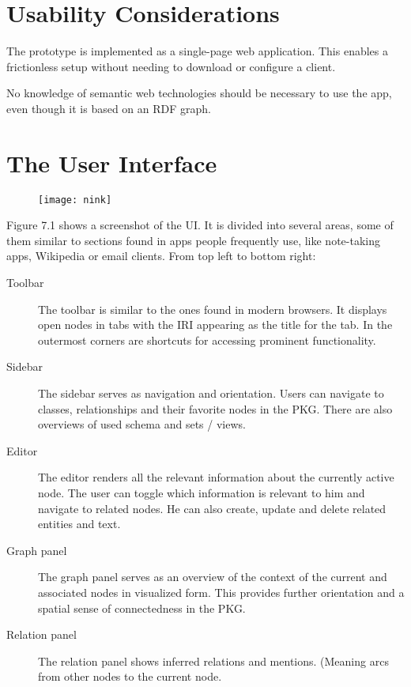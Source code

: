 \section{Usability Considerations}

The prototype is implemented as a single-page web application. This enables a frictionless setup without needing to download or configure a client.

No knowledge of semantic web technologies should be necessary to use the app, even though it is based on an RDF graph.

\section{The User Interface} 

\begin{figure}[H]
    \texttt{[image: nink]}
\end{figure}

Figure 7.1 shows a screenshot of the UI. It is divided into several areas, some of them similar to sections found in apps people frequently use, like note-taking apps, Wikipedia or email clients. From top left to bottom right:
\begin{description}
    \item[Toolbar] The toolbar is similar to the ones found in modern browsers. It displays open nodes in tabs with the IRI appearing as the title for the tab. In the outermost corners are shortcuts for accessing prominent functionality.
    \item[Sidebar] The sidebar serves as navigation and orientation. Users can navigate to classes, relationships and their favorite nodes in the PKG. There are also overviews of used schema and sets / views.
    \item[Editor] The editor renders all the relevant information about the currently active node. The user can toggle which information is relevant to him and navigate to related nodes. He can also create, update and delete related entities and text.
    \item[Graph panel] The graph panel serves as an overview of the context of the current and associated nodes in visualized form. This provides further orientation and a spatial sense of connectedness in the PKG.
    \item[Relation panel] The relation panel shows inferred relations and mentions. (Meaning arcs from other nodes to the current node.
\end{description}

